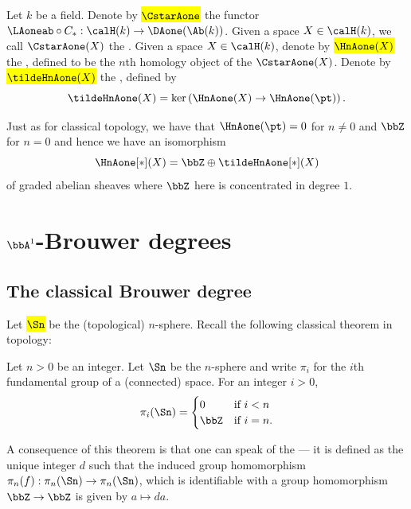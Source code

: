\begin{definition}
    Let $k$ be a field. Denote by \hl{$\CstarAone$} the functor $\LAoneab \circ C_*: \calH(k) \to \DAone(\Ab(k))$. Given a space $X \in \calH(k)$, we call $\CstarAone(X)$ the .
    Given a space $X \in \calH(k)$, denote by \hl{$\HnAone(X)$} the , defined to be the $n$th homology object of the $\CstarAone(X)$. Denote by \hl{$\tildeHnAone(X)$} the , defined by
    $$\tildeHnAone(X) = \ker\left(\HnAone(X) \to \HnAone(\pt) \right).$$
\end{definition}

\begin{remark}
    Just as for classical topology, we have that $\HnAone(\pt) = 0$ for $n \neq 0$ and $\bbZ$ for $n = 0$ and hence we have an isomorphism 
    $$\HnAone[*](X) = \bbZ \oplus \tildeHnAone[*](X)$$
    of graded abelian sheaves where $\bbZ$ here is concentrated in degree $1$.
\end{remark}





\section{\texorpdfstring{$\bbA^1$}{A1}-Brouwer degrees}

\subsection{The classical Brouwer degree}
Let \hl{$\Sn$} be the (topological) $n$-sphere. Recall the following classical theorem in topology:
\begin{theorem}
    Let $n > 0$ be an integer. Let $\Sn$ be the $n$-sphere and write $\pi_i$ for the $i$th fundamental group of a (connected) space. For an integer $i > 0$, 
    \begin{align*}
        \pi_i(\Sn) = \begin{cases} 0 &\text{if } i < n \\ \bbZ &\text{if } i = n. \end{cases}
    \end{align*}
\end{theorem}
A consequence of this theorem is that one can speak of the  --- it is defined as the unique integer $d$ such that the induced group homomorphism $\pi_n(f) : \pi_n(\Sn) \to \pi_n(\Sn)$, which is identifiable with a group homomorphism $\bbZ \to \bbZ$ is given by $a \mapsto da$. 


